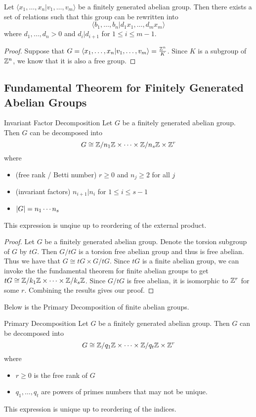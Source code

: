 \documentclass[a4paper]{article}
\begin{document}
\begin{prp}{}{} Let $\langle x_1,\dots,x_n|v_1,\dots,v_m\rangle$ be a finitely generated abelian group. Then there exists a set of relations such that this group can be rewritten into $$\langle b_1,\dots,b_n|d_1x_1,\dots,d_mx_m\rangle$$ where $d_1,\dots,d_n>0$ and $d_i|d_{i+1}$ for $1\leq i\leq m-1$. \tcbline
\begin{proof}
Suppose that $G=\langle x_1,\dots,x_n|v_1,\dots,v_m\rangle=\frac{\mathbb{Z}^n}{K}$. Since $K$ is a subgroup of $\mathbb{Z}^n$, we know that it is also a free group. 
\end{proof}
\end{prp}

\subsection{Fundamental Theorem for Finitely Generated Abelian Groups}
\begin{thm}{Invariant Factor Decomposition}{} Let $G$ be a finitely generated abelian group. Then $G$ can be decomposed into $$G\cong \mathbb{Z}/n_1\mathbb{Z}\times\cdots\times\mathbb{Z}/n_s\mathbb{Z}\times\mathbb{Z}^r$$ where 
\begin{itemize}
\item (free rank / Betti number) $r\geq 0$ and $n_j\geq 2$ for all $j$
\item (invariant factors) $n_{i+1}|n_i$ for $1\leq i\leq s-1$
\item $\abs{G}=n_1\cdots n_s$
\end{itemize}
This expression is unqiue up to reordering of the external product. \tcbline
\begin{proof}
Let $G$ be a finitely generated abelian group. Denote the torsion subgroup of $G$ by $tG$. Then $G/tG$ is a torsion free abelian group and thus is free abelian. Thus we have that $G\cong tG\times G/tG$. Since $tG$ is a finite abelian group, we can invoke the the fundamental theorem for finite abelian groups to get $tG\cong\mathbb{Z}/k_1\mathbb{Z}\times\cdots\times\mathbb{Z}/k_s\mathbb{Z}$. Since $G/tG$ is free abelian, it is isomorphic to $\mathbb{Z}^r$ for some $r$. Combining the results gives our proof. 
\end{proof}
\end{thm}

Below is the Primary Decomposition of finite abelian groups. 

\begin{thm}{Primary Decomposition}{} Let $G$ be a finitely generated abelian group. Then $G$ can be decomposed into $$G\cong\mathbb{Z}/q_1\mathbb{Z}\times\cdots\times\mathbb{Z}/q_t\mathbb{Z}\times\mathbb{Z}^r$$ where 
\begin{itemize}
\item $r\geq 0$ is the free rank of $G$
\item $q_1,\dots,q_t$ are powers of primes numbers that may not be unique. 
\end{itemize}
This expression is unique up to reordering of the indices. 
\end{thm}
\end{document}
